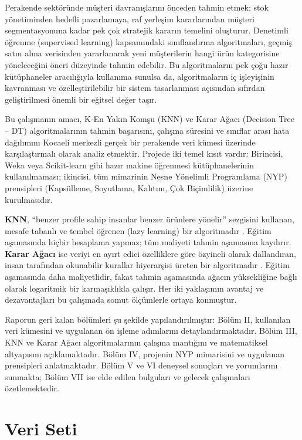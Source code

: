 \documentclass[conference]{IEEEtran}
\begin{document}
Perakende sektöründe müşteri davranışlarını önceden tahmin etmek; stok yönetiminden hedefli pazarlamaya, raf yerleşim kararlarından müşteri segmentasyonuna kadar pek çok stratejik kararın temelini oluşturur. Denetimli öğrenme (supervised learning) kapsamındaki sınıflandırma algoritmaları, geçmiş satın alma verisinden yararlanarak yeni müşterilerin hangi ürün kategorisine yöneleceğini öneri düzeyinde tahmin edebilir. Bu algoritmaların pek çoğu hazır kütüphaneler aracılığıyla kullanıma sunulsa da, algoritmaların iç işleyişinin kavranması ve özelleştirilebilir bir sistem tasarlanması açısından sıfırdan geliştirilmesi önemli bir eğitsel değer taşır.

Bu çalışmanın amacı, K-En Yakın Komşu (KNN) ve Karar Ağacı (Decision Tree -- DT) algoritmalarının tahmin başarısını, çalışma süresini ve sınıflar arası hata dağılımını Kocaeli merkezli gerçek bir perakende veri kümesi üzerinde karşılaştırmalı olarak analiz etmektir. Projede iki temel kısıt vardır: Birincisi, Weka veya Scikit-learn gibi hazır makine öğrenmesi kütüphanelerinin kullanılmaması; ikincisi, tüm mimarinin Nesne Yönelimli Programlama (NYP) prensipleri (Kapsülleme, Soyutlama, Kalıtım, Çok Biçimlilik) üzerine kurulmasıdır.

\textbf{KNN}, ``benzer profile sahip insanlar benzer ürünlere yönelir'' sezgisini kullanan, mesafe tabanlı ve tembel öğrenen (lazy learning) bir algoritmadır \cite{cover}. Eğitim aşamasında hiçbir hesaplama yapmaz; tüm maliyeti tahmin aşamasına kaydırır. \textbf{Karar Ağacı} ise veriyi en ayırt edici özelliklere göre özyineli olarak dallandıran, insan tarafından okunabilir kurallar hiyerarşisi üreten bir algoritmadır \cite{quinlan}. Eğitim aşamasında daha maliyetlidir, fakat tahmin aşamasında ağacın yüksekliğine bağlı olarak logaritmik bir karmaşıklıkla çalışır. Her iki yaklaşımın avantaj ve dezavantajları bu çalışmada somut ölçümlerle ortaya konmuştur.

Raporun geri kalan bölümleri şu şekilde yapılandırılmıştır: Bölüm II, kullanılan veri kümesini ve uygulanan ön işleme adımlarını detaylandırmaktadır. Bölüm III, KNN ve Karar Ağacı algoritmalarının çalışma mantığını ve matematiksel altyapısını açıklamaktadır. Bölüm IV, projenin NYP mimarisini ve uygulanan prensipleri anlatmaktadır. Bölüm V ve VI deneysel sonuçları ve yorumlarını sunmakta; Bölüm VII ise elde edilen bulguları ve gelecek çalışmaları özetlemektedir.

\section{Veri Seti}
\end{document}
